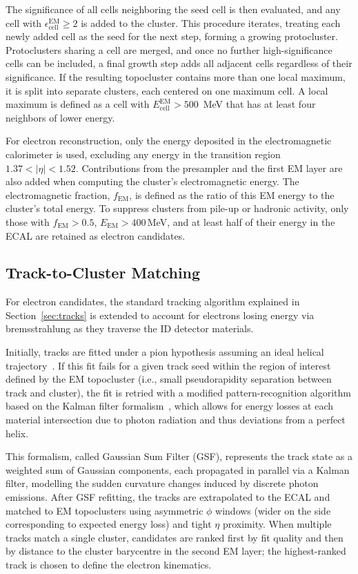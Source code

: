 The significance of all cells neighboring the seed cell is then evaluated, and any cell with $\epsilon_{\text{cell}}^{\text{EM}} \geq 2$ is added to the cluster. This procedure iterates, treating each newly added cell as the seed for the next step, forming a growing protocluster. Protoclusters sharing a cell are merged, and once no further high-significance cells can be included, a final growth step adds all adjacent cells regardless of their significance. If the resulting topocluster contains more than one local maximum, it is split into separate clusters, each centered on one maximum cell. A local maximum is defined as a cell with \(E_{\text{cell}}^{\text{EM}}>500\)~MeV that has at least four neighbors of lower energy.

For electron reconstruction, only the energy deposited in the electromagnetic calorimeter is used, excluding any energy in the transition region \(1.37<|\eta|<1.52\). 
Contributions from the presampler and the first EM layer are also added when computing the cluster’s electromagnetic energy. The electromagnetic fraction, \(f_{\text{EM}}\), is defined as the ratio of this EM energy to the cluster’s total energy. To suppress clusters from pile-up or hadronic activity, only those with \(f_{\text{EM}}>0.5\), \(E_{\text{EM}}>400\)\,MeV, and at least half of their energy in the ECAL are retained as electron candidates.  

\subsection{Track-to-Cluster Matching}

For electron candidates, the standard tracking algorithm explained in Section~\ref{sec:tracks} is extended to account for electrons losing energy via bremsstrahlung as they traverse the ID detector materials. 

Initially, tracks are fitted under a pion hypothesis assuming an ideal helical trajectory~\cite{tracks}. If this fit fails for a given track seed within the region of interest defined by the EM topocluster (i.e., small pseudorapidity separation between track and cluster), the fit is retried with a modified pattern-recognition algorithm based on the Kalman filter formalism~\cite{FRUHWIRTH1987444}, which allows for energy losses at each material intersection due to photon radiation and thus deviations from a perfect helix.

This formalism, called Gaussian Sum Filter (GSF), represents the track state as a weighted sum of Gaussian components, each propagated in parallel via a Kalman filter, modelling the sudden curvature changes induced by discrete photon emissions. After GSF refitting, the tracks are extrapolated to the ECAL and matched to EM topoclusters using asymmetric $\phi$ windows (wider on the side corresponding to expected energy loss) and tight $\eta$ proximity. When multiple tracks match a single cluster, candidates are ranked first by fit quality and then by distance to the cluster barycentre in the second EM layer; the highest-ranked track is chosen to define the electron kinematics.


